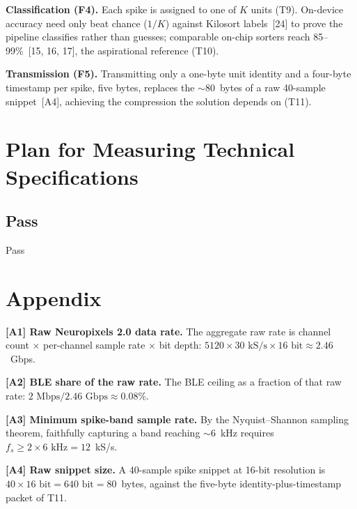 \documentclass[11pt]{article}
\begin{document}
\textbf{Classification (F4).} Each spike is assigned to one of $K$ units (T9). On-device
accuracy need only beat chance ($1/K$) against Kilosort labels~[24] to prove the pipeline
classifies rather than guesses; comparable on-chip sorters reach 85--99\%~[15, 16, 17], the
aspirational reference (T10).

\textbf{Transmission (F5).} Transmitting only a one-byte unit identity and a four-byte
timestamp per spike, five bytes, replaces the $\sim$80~bytes of a raw 40-sample snippet~[A4],
achieving the compression the solution depends on (T11).

\section{Plan for Measuring Technical Specifications}

\subsection{Pass}
Pass


\section*{Appendix}

\noindent\textbf{[A1] Raw Neuropixels 2.0 data rate.} The aggregate raw rate is channel
count $\times$ per-channel sample rate $\times$ bit depth:
$5120 \times 30\text{~kS/s} \times 16\text{~bit} \approx 2.46$~Gbps.

\smallskip
\noindent\textbf{[A2] BLE share of the raw rate.} The BLE ceiling as a fraction of that raw
rate: $2\text{~Mbps} / 2.46\text{~Gbps} \approx 0.08\%$.

\smallskip
\noindent\textbf{[A3] Minimum spike-band sample rate.} By the Nyquist--Shannon sampling
theorem, faithfully capturing a band reaching $\sim$6~kHz requires
$f_s \geq 2 \times 6\text{~kHz} = 12$~kS/s.

\smallskip
\noindent\textbf{[A4] Raw snippet size.} A 40-sample spike snippet at 16-bit resolution is
$40 \times 16\text{~bit} = 640\text{~bit} = 80$~bytes, against the five-byte
identity-plus-timestamp packet of T11.
\end{document}
